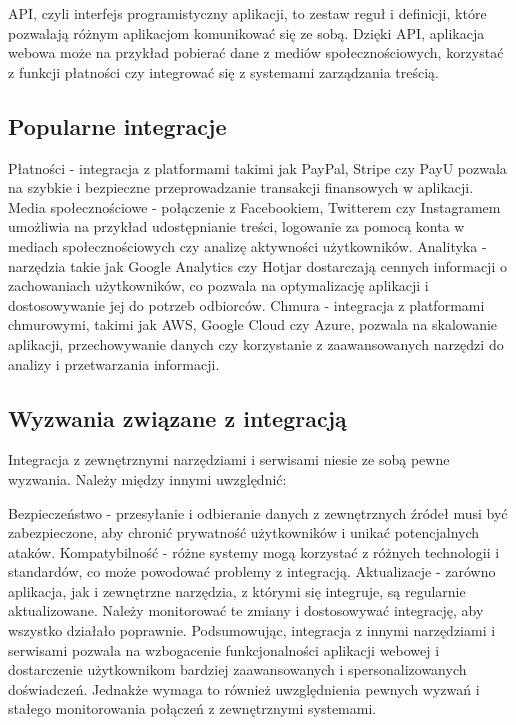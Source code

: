 API, czyli interfejs programistyczny aplikacji, to zestaw reguł i definicji, które pozwalają różnym aplikacjom komunikować się ze sobą. Dzięki API, aplikacja webowa może na przykład pobierać dane z mediów społecznościowych, korzystać z funkcji płatności czy integrować się z systemami zarządzania treścią.

\subsection{Popularne integracje}

Płatności - integracja z platformami takimi jak PayPal, Stripe czy PayU pozwala na szybkie i bezpieczne przeprowadzanie transakcji finansowych w aplikacji.
Media społecznościowe - połączenie z Facebookiem, Twitterem czy Instagramem umożliwia na przykład udostępnianie treści, logowanie za pomocą konta w mediach społecznościowych czy analizę aktywności użytkowników.
Analityka - narzędzia takie jak Google Analytics czy Hotjar dostarczają cennych informacji o zachowaniach użytkowników, co pozwala na optymalizację aplikacji i dostosowywanie jej do potrzeb odbiorców.
Chmura - integracja z platformami chmurowymi, takimi jak AWS, Google Cloud czy Azure, pozwala na skalowanie aplikacji, przechowywanie danych czy korzystanie z zaawansowanych narzędzi do analizy i przetwarzania informacji.

\subsection{Wyzwania związane z integracją}

Integracja z zewnętrznymi narzędziami i serwisami niesie ze sobą pewne wyzwania. Należy między innymi uwzględnić:

Bezpieczeństwo - przesyłanie i odbieranie danych z zewnętrznych źródeł musi być zabezpieczone, aby chronić prywatność użytkowników i unikać potencjalnych ataków.
Kompatybilność - różne systemy mogą korzystać z różnych technologii i standardów, co może powodować problemy z integracją.
Aktualizacje - zarówno aplikacja, jak i zewnętrzne narzędzia, z którymi się integruje, są regularnie aktualizowane. Należy monitorować te zmiany i dostosowywać integrację, aby wszystko działało poprawnie.
Podsumowując, integracja z innymi narzędziami i serwisami pozwala na wzbogacenie funkcjonalności aplikacji webowej i dostarczenie użytkownikom bardziej zaawansowanych i spersonalizowanych doświadczeń. Jednakże wymaga to również uwzględnienia pewnych wyzwań i stałego monitorowania połączeń z zewnętrznymi systemami.